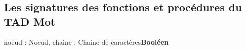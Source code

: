 \subsection{Les signatures des fonctions et procédures du TAD Mot}
    \begin{algorithme}
    {noeud : Noeud, chaine : Chaine de caractères}{\textbf{Booléen}}
    \end{algorithme}
